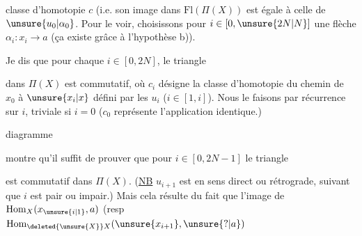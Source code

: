 
classe d'homotopie  $c$ (i.e. son image dans $\mathrm{Fl}(\Pi(X))$ est égale à celle de $\unsure{u_0|\alpha_0}$. Pour le voir, choisissons pour  $i\in[0,\unsure{2N|N}]$ une flèche $\alpha_i:x_i\longrightarrow a$  (ça existe grâce à l'hypothèse b)).

Je dis que pour chaque $i\in[0,2N]$, le triangle


dans $\Pi(X)$ est commutatif, où $c_i$ désigne la classe d'homotopie du chemin de $x_0$ à $\unsure{x_i|x}$ défini par les $u_i$ ($i\in[1,i]$). Nous le faisons par récurrence sur $i$,   triviale si $i=0$ ($c_0$ représente l'application identique.)

  diagramme


montre qu'il suffit de prouver que pour $i\in[0,2N-1]$ le triangle


est commutatif dans $\Pi(X)$. (\uline{NB} $u_{i+1}$ est en sens direct ou rétrograde, suivant que $i$ est pair ou impair.) Mais cela résulte du fait que  l'image de $\operatorname{Hom}_X(x_{\unsure{i|1}},a)$ (resp $\operatorname{Hom}_{\deleted{\unsure{X}}X}(\unsure{x_{i+1}},\unsure{?|a})$

